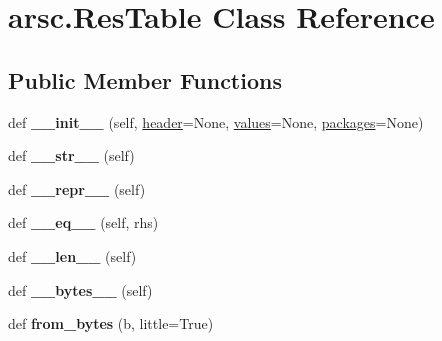 \hypertarget{classarsc_1_1ResTable}{}\section{arsc.\+Res\+Table Class Reference}
\label{classarsc_1_1ResTable}
\subsection*{Public Member Functions}
\begin{DoxyCompactItemize}
\item 
\mbox{\label{classarsc_1_1ResTable_aaa796a8dd9d0c2ecddf50c32379657ab}} 
def {\bfseries \+\_\+\+\_\+init\+\_\+\+\_\+} (self, \mbox{\hyperlink{classarsc_1_1ResTable_a04f14756cc2a3b1896fadca1f556f7d7}{header}}=None, \mbox{\hyperlink{classarsc_1_1ResTable_aa32fa0072c5535ef46837e8e659c6ab5}{values}}=None, \mbox{\hyperlink{classarsc_1_1ResTable_a7446528982666902550f44c8037a3c5a}{packages}}=None)
\item 
\mbox{\label{classarsc_1_1ResTable_a18c3b468468281f665802af32f6edff5}} 
def {\bfseries \+\_\+\+\_\+str\+\_\+\+\_\+} (self)
\item 
\mbox{\label{classarsc_1_1ResTable_af1830559f34eba2f2a75875394341502}} 
def {\bfseries \+\_\+\+\_\+repr\+\_\+\+\_\+} (self)
\item 
\mbox{\label{classarsc_1_1ResTable_a8bd6e431096b14d9f19d85ab6c3af589}} 
def {\bfseries \+\_\+\+\_\+eq\+\_\+\+\_\+} (self, rhs)
\item 
\mbox{\label{classarsc_1_1ResTable_a709fc13c7694c1ed2c62d1b46db17238}} 
def {\bfseries \+\_\+\+\_\+len\+\_\+\+\_\+} (self)
\item 
\mbox{\label{classarsc_1_1ResTable_a199897373ee290fbc6ed8f4d749b53f2}} 
def {\bfseries \+\_\+\+\_\+bytes\+\_\+\+\_\+} (self)
\item 
\mbox{\label{classarsc_1_1ResTable_accd2406f64e54bb48de534ae56e8a07f}} 
def {\bfseries from\+\_\+bytes} (b, little=True)
\end{DoxyCompactItemize}
